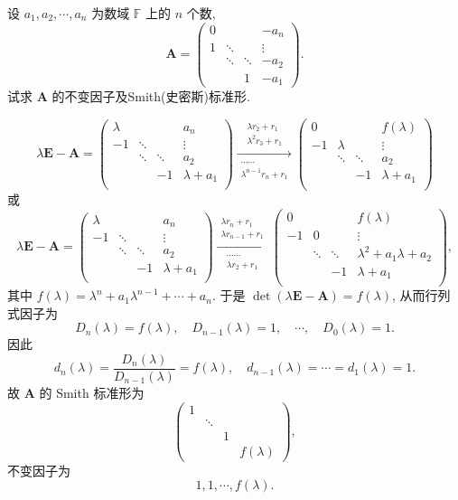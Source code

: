 \documentclass[../../main.tex]{subfiles}
\begin{document}
\begin{example}
设 $a_1, a_2, \cdots, a_n$ 为数域 $\mathbb{F}$ 上的 $n$ 个数,
\[
\boldsymbol{A} = \begin{pmatrix} 
0 & & & -a_n \\
1 & \ddots & & \vdots \\
& \ddots & \ddots & -a_2 \\
& & 1 & -a_1 
\end{pmatrix}.
\]
试求 $\boldsymbol{A}$ 的不变因子及Smith(史密斯)标准形.
\end{example}
\begin{solution}
$$\lambda\boldsymbol{E}-\boldsymbol{A}=\begin{pmatrix}
\lambda& & & a_n\\
-1& \ddots& & \vdots\\
& \ddots& \ddots& a_2\\
& & -1& \lambda +a_1\\
\end{pmatrix}\xrightarrow[\substack{\cdots \cdots\\\lambda ^{n-1}r_n+r_1}]{\substack{\lambda r_2+r_1\\\lambda ^2r_3+r_1}}\begin{pmatrix}
0& & & f\left( \lambda \right)\\
-1& \lambda& & \vdots\\
& \ddots& \ddots& a_2\\
& & -1& \lambda +a_1\\
\end{pmatrix}$$
或
$$\lambda\boldsymbol{E}-\boldsymbol{A}=\begin{pmatrix}
\lambda& & & a_n\\
-1& \ddots& & \vdots\\
& \ddots& \ddots& a_2\\
& & -1& \lambda +a_1\\
\end{pmatrix}\xrightarrow[\substack{\cdots \cdots\\\lambda r_2+r_1}]{\substack{\lambda r_n+r_1\\\lambda r_{n-1}+r_1}}\begin{pmatrix}
0& & & f\left( \lambda \right)\\
-1& 0& & \vdots\\
& \ddots& \ddots& \lambda ^2+a_1\lambda +a_2\\
& & -1& \lambda +a_1\\
\end{pmatrix},$$
其中 $f(\lambda) = \lambda^n + a_1\lambda^{n-1} + \cdots + a_n$. 于是 $\det(\lambda\boldsymbol{E} - \boldsymbol{A}) = f(\lambda)$, 从而行列式因子为
\[
D_n(\lambda) = f(\lambda), \quad D_{n-1}(\lambda) = 1, \quad \cdots, \quad D_0(\lambda) = 1.
\]
因此
\[
d_n(\lambda) = \frac{D_n(\lambda)}{D_{n-1}(\lambda)} = f(\lambda), \quad d_{n-1}(\lambda) = \cdots = d_1(\lambda) = 1.
\]
故 $\boldsymbol{A}$ 的 Smith 标准形为
\[
\begin{pmatrix} 
1 & & & \\
& \ddots & & \\
& & 1 & \\
& & & f(\lambda) 
\end{pmatrix},
\]
不变因子为
\[
1, 1, \cdots, f(\lambda).
\]


\end{solution}
\end{document}
